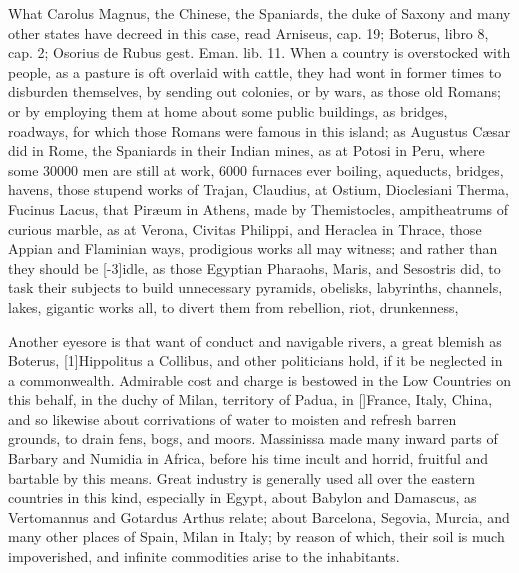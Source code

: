 What Carolus Magnus, the Chinese, the Spaniards, the duke of Saxony and
many other states have decreed in this case, read Arniseus, cap. 19;
Boterus, libro 8, cap. 2; Osorius de Rubus gest. Eman. lib. 11. When a
country is overstocked with people, as a pasture is oft overlaid with
cattle, they had wont in former times to disburden themselves, by
sending out colonies, or by wars, as those old Romans; or by employing
them at home about some public buildings, as bridges, roadways, for
which those Romans were famous in this island; as Augustus C\ae{}sar did
in Rome, the Spaniards in their Indian mines, as at Potosi in Peru,
where some 30\thinspace{}000 men are still at work, 6000 furnaces ever boiling,
\etc{} aqueducts, bridges, havens, those stupend works of Trajan,
Claudius, at Ostium, Dioclesiani Therma, Fucinus Lacus, that
Pir\ae{}um in Athens, made by Themistocles, ampitheatrums of curious
marble, as at Verona, Civitas Philippi, and Heraclea in Thrace, those
Appian and Flaminian ways, prodigious works all may witness; and rather
than they should be [-3\baselineskip]idle, as those  Egyptian Pharaohs, Maris,
and Sesostris did, to task their subjects to build unnecessary
pyramids, obelisks, labyrinths, channels, lakes, gigantic works all, to
divert them from rebellion, riot, drunkenness, 

Another eyesore is that want of conduct and navigable rivers, a great
blemish as Boterus, [1\baselineskip]Hippolitus a Collibus, and other
politicians hold, if it be neglected in a commonwealth. Admirable cost
and charge is bestowed in the Low Countries on this behalf, in the
duchy of Milan, territory of Padua, in [\baselineskip]France, Italy, China, and
so likewise about corrivations of water to moisten and refresh barren
grounds, to drain fens, bogs, and moors. Massinissa made many inward
parts of Barbary and Numidia in Africa, before his time incult and
horrid, fruitful and bartable by this means. Great industry is
generally used all over the eastern countries in this kind, especially
in Egypt, about Babylon and Damascus, as Vertomannus and Gotardus
Arthus relate; about Barcelona, Segovia, Murcia, and many other places
of Spain, Milan in Italy; by reason of which, their soil is much
impoverished, and infinite commodities arise to the inhabitants.

